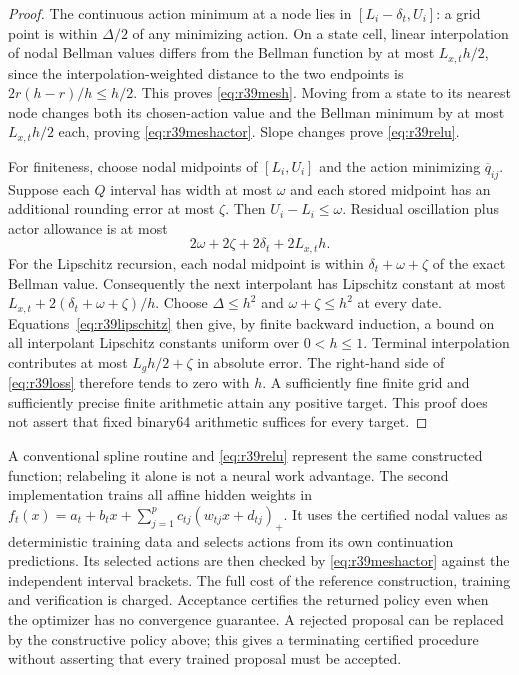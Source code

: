 \documentclass[ecta,nameyear,draft]{econsocart}
\theoremstyle{definition}
\theoremstyle{remark}
\begin{document}
\begin{proof}
The continuous action minimum at a node lies in $[L_i-\delta_t,U_i]$:
a grid point is within $\Delta/2$ of any minimizing action. On a state cell,
linear interpolation of nodal Bellman values differs from the Bellman function
by at most $L_{x,t}h/2$, since the interpolation-weighted distance to the two
endpoints is $2r(h-r)/h\leq h/2$. This proves \eqref{eq:r39mesh}.
Moving from a state to its nearest node changes both its chosen-action value
and the Bellman minimum by at most $L_{x,t}h/2$ each, proving
\eqref{eq:r39meshactor}. Slope changes prove \eqref{eq:r39relu}.

For finiteness, choose nodal midpoints of $[L_i,U_i]$ and the action minimizing
$\overline q_{ij}$. Suppose each $Q$ interval has width at most $\omega$ and
each stored midpoint has an additional rounding error at most $\zeta$.
Then $U_i-L_i\leq\omega$. Residual oscillation plus actor allowance is at most
\[
 2\omega+2\zeta+2\delta_t+2L_{x,t}h.
\]
For the Lipschitz recursion, each nodal midpoint is within
$\delta_t+\omega+\zeta$ of the exact Bellman value. Consequently the next
interpolant has Lipschitz constant at most
$L_{x,t}+2(\delta_t+\omega+\zeta)/h$.
Choose $\Delta\leq h^2$ and $\omega+\zeta\leq h^2$ at every date.
Equations~\eqref{eq:r39lipschitz} then give, by finite backward induction,
a bound on all interpolant Lipschitz constants uniform over $0<h\leq1$.
Terminal interpolation contributes at most $L_g h/2+\zeta$ in absolute error.
The right-hand side of \eqref{eq:r39loss} therefore tends to zero with $h$.
A sufficiently fine finite grid and sufficiently precise finite arithmetic
attain any positive target. This proof does not assert that fixed binary64
arithmetic suffices for every target.
\end{proof}

A conventional spline routine and \eqref{eq:r39relu} represent the same
constructed function; relabeling it alone is not a neural work advantage.
The second implementation trains all affine hidden weights in
$f_t(x)=a_t+b_tx+\sum_{j=1}^p c_{tj}(w_{tj}x+d_{tj})_+$.
It uses the certified nodal values as deterministic training data and selects
actions from its own continuation predictions. Its selected actions are then
checked by \eqref{eq:r39meshactor} against the independent interval brackets.
The full cost of the reference construction, training and verification is
charged. Acceptance certifies the returned policy even when the optimizer has
no convergence guarantee. A rejected proposal can be replaced by the
constructive policy above; this gives a terminating certified procedure without
asserting that every trained proposal must be accepted.
\end{document}
